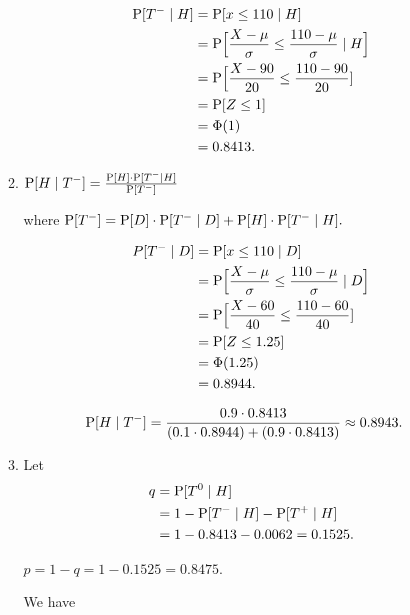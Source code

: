 \documentclass{article}
\begin{document}
\begin{enumerate}
\begin{enumerate}[label=(\alph*)]
        \begin{align*}
            \text P[T^- \mid H]
            & = \text P[x \le 110 \mid H] \\
            & = \text P \Big[\frac{X - \mu}{\sigma} \le \frac{110 - \mu}{\sigma} \mid H \Big] \\
            & = \text P \Big[\frac{X - 90}{20} \le \frac{110 - 90}{20}] \\
            & = \text P[Z \le 1] \\
            & = \Phi(1) \\
            & = 0.8413.
        \end{align*}
       
        \item 
        $\text P[H \mid T^-] = \frac{\text P[H] \cdot \text P[T^- \mid H]}{\text P[T^-]}$

        where $\text P[T^-] = \text P[D] \cdot \text P[T^- \mid D] + \text P[H] \cdot \text P[T^- \mid H].$

        \begin{align*}
            P[T^- \mid D]
            & = \text P[x \le 110 \mid D] \\
            & = \text P \Big[\frac{X - \mu}{\sigma} \le \frac{110 - \mu}{\sigma} \mid D \Big] \\
            & = \text P \Big[\frac{X - 60}{40} \le \frac{110 - 60}{40}] \\
            & = \text P[Z \le 1.25] \\
            & = \Phi(1.25) \\
            & = 0.8944.
        \end{align*}

        \begin{align*}
            \text P[H \mid T^-]
            & = \frac{0.9 \cdot 0.8413}{(0.1 \cdot 0.8944) + (0.9 \cdot 0.8413)} \approx 0.8943.
        \end{align*}

        \item 
        Let
        \begin{align*}
            q 
            & = \text P[T^0 \mid H] \\
            & = 1 - \text P[T^- \mid H] - \text P[T^+ \mid H] \\
            & = 1 - 0.8413 - 0.0062 = 0.1525.
        \end{align*}

        $p = 1 - q = 1 - 0.1525 = 0.8475.$

        We have


\end{enumerate}
\end{enumerate}
\end{document}
